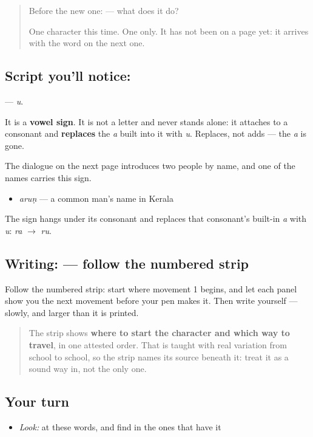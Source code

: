\begin{quote}
Before the new one:  — what does it do?

One character this time. One only. It has not been on a page yet: it arrives with the word on the next one.
\end{quote}

\subsection*{Script you'll notice: }
\textbf{} — \emph{u}.

It is a \textbf{vowel sign}. It is not a letter and never stands alone: it attaches to a consonant and \textbf{replaces} the \emph{a} built into it with \emph{u}. Replaces, not adds — the \emph{a} is gone.

The dialogue on the next page introduces two people by name, and one of the names carries this sign.

\begin{itemize}
\raggedright
  \item \textbf{} \emph{aruṇ} — a common man's name in Kerala
\end{itemize}

The sign hangs under its consonant and replaces that consonant's built-in \emph{a} with \emph{u}: \textbf{} \emph{ra} $\to$ \textbf{} \emph{ru}.

\subsection*{Writing:  — follow the numbered strip}

Follow the numbered strip: start where movement 1 begins, and let each panel show you the next movement before your pen makes it. Then write  yourself — slowly, and larger than it is printed.

\begin{quote}
The strip shows \textbf{where to start the character and which way to travel}, in one attested order. That is taught with real variation from school to school, so the strip names its source beneath it: treat it as a sound way in, not the only one.
\end{quote}

\subsection*{Your turn}
\begin{itemize}
\raggedright
  \item \emph{Look:} at these words, and find  in the ones that have it
\end{itemize}

